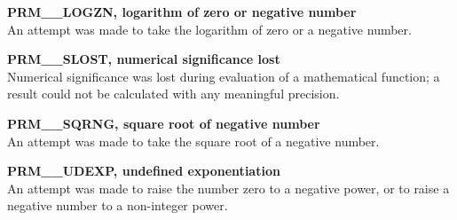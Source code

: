 \begin{description}
\item {\bf PRM\_\_LOGZN, logarithm of zero or negative number}\\
An attempt was made to take the logarithm of zero or a negative number.

\item {\bf PRM\_\_SLOST, numerical significance lost}\\
Numerical significance was lost during evaluation of a mathematical
function; a result could not be calculated with any meaningful precision.

\item {\bf PRM\_\_SQRNG, square root of negative number}\\
An attempt was made to take the square root of a negative number.

\item {\bf PRM\_\_UDEXP, undefined exponentiation}\\
An attempt was made to raise the number zero to a negative power, or to raise a
negative number to a non-integer power.

\end{description}



